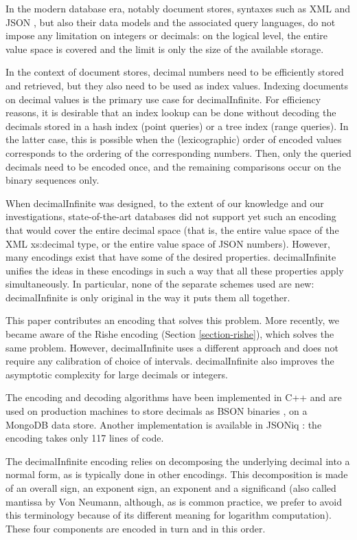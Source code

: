 \documentclass{acm_proc_article-sp}
\begin{document}
In the modern database era, notably document stores, syntaxes such as XML \cite{XML} and JSON \cite{JSON}, but also their data models and the associated query languages, do not impose any limitation on integers or decimals: on the logical level, the entire value space is covered and the limit is only the size of the available storage.

In the context of document stores, decimal numbers need to be efficiently stored and retrieved, but they also need to be used as index values. Indexing documents on decimal values is the primary use case for decimalInfinite. For efficiency reasons, it is desirable that an index lookup can be done without decoding the decimals stored in a hash index (point queries) or a tree index (range queries). In the latter case, this is possible when the (lexicographic) order of encoded values corresponds to the ordering of the corresponding numbers. Then, only the queried decimals need to be encoded once, and the remaining comparisons occur on the binary sequences only. 

When decimalInfinite was designed, to the extent of our knowledge and our investigations, state-of-the-art databases did not support yet such an encoding that would cover the entire decimal space (that is, the entire value space of the XML xs:decimal type, or the entire value space of JSON numbers). However, many encodings exist that have some of the desired properties. decimalInfinite unifies the ideas in these encodings in such a way that all these properties apply simultaneously. In particular, none of the separate schemes used are new: decimalInfinite is only original in the way it puts them all together.

This paper contributes an encoding that solves this problem. More recently, we became aware of the Rishe encoding (Section \ref{section-rishe}), which solves the same problem. However, decimalInfinite uses a different approach and does not require any calibration of choice of intervals. decimalInfinite also improves the asymptotic complexity for large decimals or integers.

The encoding and decoding algorithms have been implemented in C++ and are used on production machines to store decimals as BSON binaries \cite{BSON}, on a MongoDB \cite{MongoDB} data store. Another implementation is available in JSONiq \cite{decimalInfiniteJSONiq}: the encoding takes only 117 lines of code.

The decimalInfinite encoding relies on decomposing the underlying decimal into a normal form, as is typically done in other encodings. This decomposition is made of an overall sign, an exponent sign, an exponent and a significand (also called mantissa by Von Neumann, although, as is common practice, we prefer to avoid this terminology because of its different meaning for logarithm computation). These four components are encoded in turn and in this order.
\end{document}
